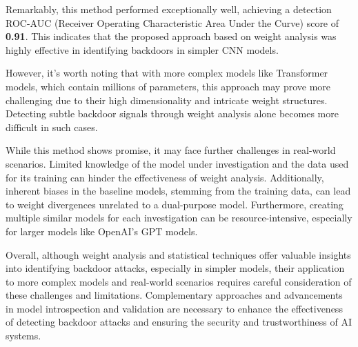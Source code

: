 Remarkably, this method performed exceptionally well, achieving a detection ROC-AUC (Receiver Operating Characteristic Area Under the Curve) score of \textbf{0.91}. This indicates that the proposed approach based on weight analysis was highly effective in identifying backdoors in simpler CNN models.

However, it's worth noting that with more complex models like Transformer models, which contain millions of parameters, this approach may prove more challenging due to their high dimensionality and intricate weight structures. Detecting subtle backdoor signals through weight analysis alone becomes more difficult in such cases.

While this method shows promise, it may face further challenges in real-world scenarios. Limited knowledge of the model under investigation and the data used for its training can hinder the effectiveness of weight analysis. Additionally, inherent biases in the baseline models, stemming from the training data, can lead to weight divergences unrelated to a dual-purpose model. Furthermore, creating multiple similar models for each investigation can be resource-intensive, especially for larger models like OpenAI's GPT models.

Overall, although weight analysis and statistical techniques offer valuable insights into identifying backdoor attacks, especially in simpler models, their application to more complex models and real-world scenarios requires careful consideration of these challenges and limitations. Complementary approaches and advancements in model introspection and validation are necessary to enhance the effectiveness of detecting backdoor attacks and ensuring the security and trustworthiness of AI systems.
